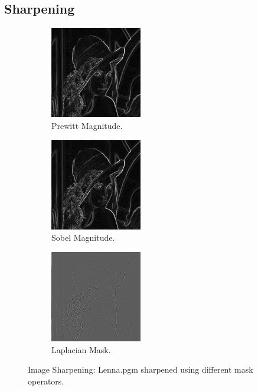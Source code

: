\documentclass[letterpaper,10pt]{article}
\begin{document}
\subsection{Sharpening}
\begin{figure}[hbtp]
    \centering
    \begin{subfigure}{4cm}
      \includegraphics[width=4cm]{images/prewitt_lenna.png}
      \caption{Prewitt Magnitude.}
    \end{subfigure}
    \begin{subfigure}{4cm}
      \includegraphics[width=4cm]{images/sobel_lenna.png}
      \caption{Sobel Magnitude.}
    \end{subfigure}
    \begin{subfigure}{4cm}
      \includegraphics[width=4cm]{images/laplacian_lenna.png}
      \caption{Laplacian Mask.}
    \end{subfigure}
    \caption{Image Sharpening: Lenna.pgm sharpened using different mask operators.}
    \label{fig:sharpenlenna}
  \end{figure}
\end{document}
